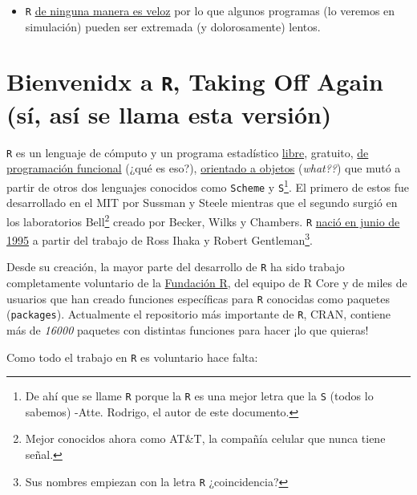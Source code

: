 \documentclass[
]{book}
\providecommand{\tightlist}{%
  \setlength{\itemsep}{0pt}\setlength{\parskip}{0pt}}
\begin{document}
\begin{itemize}
\tightlist
\item
  \texttt{R} \href{https://github.com/matthieugomez/benchmark-stata-r}{de ninguna manera es veloz} por lo que algunos programas (lo veremos en simulación) pueden ser extremada (y dolorosamente) lentos.
\end{itemize}

\hypertarget{bienvenidx-a-r-taking-off-again-suxed-asuxed-se-llama-esta-versiuxf3n}{%
\section{\texorpdfstring{Bienvenidx a \texttt{R}, Taking Off Again (sí, así se llama esta versión)}{Bienvenidx a R, Taking Off Again (sí, así se llama esta versión)}}\label{bienvenidx-a-r-taking-off-again-suxed-asuxed-se-llama-esta-versiuxf3n}}

\texttt{R} es un lenguaje de cómputo y un programa estadístico \href{https://www.gnu.org/philosophy/free-sw.html}{libre}, gratuito, \href{http://adv-r.had.co.nz/Functional-programming.html}{de programación funcional} (¿qué es eso?), \href{https://en.wikipedia.org/wiki/Object-oriented_programming}{orientado a objetos} (\emph{what??}) que mutó a partir de otros dos lenguajes conocidos como \texttt{Scheme} y \texttt{S}\footnote{De ahí que se llame \texttt{R} porque la \texttt{R} es una mejor letra que la \texttt{S} (todos lo sabemos)
  -Atte. Rodrigo, el autor de este documento.}. El primero de estos fue desarrollado en el MIT por Sussman y Steele mientras que el segundo surgió en los laboratorios Bell\footnote{Mejor conocidos ahora como AT\&T, la compañía celular que nunca tiene señal.} creado por Becker, Wilks y Chambers. \texttt{R} \href{https://cran.r-project.org/doc/html/interface98-paper/paper_2.html}{nació en junio de 1995} a partir del trabajo de Ross Ihaka y Robert Gentleman\footnote{Sus nombres empiezan con la letra \texttt{R} ¿coincidencia?}.

Desde su creación, la mayor parte del desarrollo de \texttt{R} ha sido trabajo completamente voluntario de la \href{https://www.r-project.org/foundation/}{Fundación R}, del equipo de R Core y de miles de usuarios que han creado funciones específicas para \texttt{R} conocidas como paquetes (\texttt{packages}). Actualmente el repositorio más importante de \texttt{R}, CRAN, contiene más de \emph{16000} paquetes con distintas funciones para hacer ¡lo que quieras!

Como todo el trabajo en \texttt{R} es voluntario hace falta:
\end{document}
